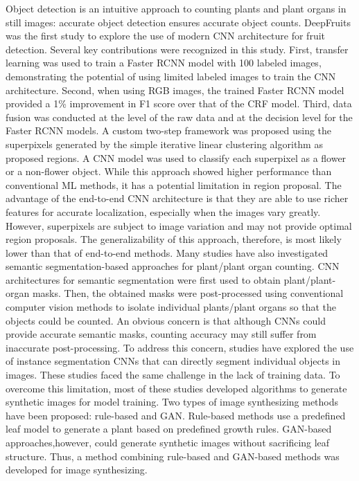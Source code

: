 Object detection is an intuitive approach to counting plants and plant organs in still images: accurate object detection ensures accurate object counts.
DeepFruits was the first study to explore the use of modern CNN architecture for fruit detection. Several key contributions were recognized in this study.
First, transfer learning was used to train a Faster RCNN model with 100 labeled images, demonstrating the potential of using limited labeled images to train the CNN
architecture. Second, when using RGB images, the trained Faster RCNN model provided a 1\% improvement in F1 score over that of the CRF model. Third, data fusion was
conducted at the level of the raw data and at the decision level for the Faster RCNN models. A custom two-step framework was proposed using the superpixels generated
by the simple iterative linear clustering algorithm as proposed regions. A CNN model was used to classify each superpixel as a flower or a non-flower object. While
this approach showed higher performance than conventional ML methods, it has a potential limitation in region proposal. The advantage of the end-to-end CNN architecture
is that they are able to use richer features for accurate localization, especially when the images vary greatly. However, superpixels are subject to image variation and
may not provide optimal region proposals. The generalizability of this approach, therefore, is most likely lower than that of end-to-end methods.
Many studies have also investigated semantic segmentation-based approaches for plant/plant organ counting. CNN architectures for semantic segmentation were first used to
obtain plant/plant-organ masks. Then, the obtained masks were post-processed using conventional computer vision methods to isolate individual plants/plant organs so that
the objects could be counted. An obvious concern is that although CNNs could provide accurate semantic masks, counting accuracy may still suffer from inaccurate
post-processing. To address this concern, studies have explored the use of instance segmentation CNNs that can directly segment individual objects in images. These
studies faced the same challenge in the lack of training data. To overcome this limitation, most of these studies developed algorithms to generate synthetic images for
model training. Two types of image synthesizing methods have been proposed: rule-based and GAN. Rule-based methods use a predefined leaf model to generate a plant based
on predefined growth rules. GAN-based approaches,however, could generate synthetic images without sacrificing leaf structure. Thus, a method combining rule-based and
GAN-based methods was developed for image synthesizing.




